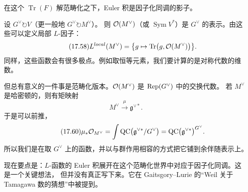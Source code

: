 在这个 $\operatorname{Tr}(F)$ 解范畴化之下，Euler 积是因子化同调的影子。

设 $G^{\vee}\circlearrowright V$（更一般地 $G^{\vee}\circlearrowright M^{\vee}$）。
则 $\mathcal{O}(M^{\vee})$（或 $\operatorname{Sym}V^*$）是 $G^{\vee}$ 的表示。由这些可以定义局部 $L$-因子：
\begin{equation}\tag{17.58}\label{eq:17.58}
L^{local}(M^{\vee})=\bigl\{g\mapsto\operatorname{Tr}\bigl(g,\mathcal{O}(M^{\vee})\bigr)\bigr\}.
\end{equation}
同样，这些函数会有很多极点。例如取恒等元素，我们要计算的是对称代数的维数。

但总有意义的一件事是范畴化版本。$\mathcal{O}(M^{\vee})$ 是 $\mathrm{Rep}(G^{\vee})$ 中的交换代数。
若 $M^{\vee}$ 是哈密顿的，则有矩映射
\begin{equation}\tag{17.59}\label{eq:17.59}
M^{\vee}\xrightarrow{\ \mu\ }\mathfrak g^{\vee*}.
\end{equation}
于是可以前推，
\begin{equation}\tag{17.60}\label{eq:17.60}
\mu_*\mathcal{O}_{M^{\vee}}=\int\mathrm{QC}\bigl(\mathfrak g^{\vee*}/G^{\vee}\bigr)
=\mathrm{QC}\bigl(\mathfrak g^{\vee*}\bigr)^{G^{\vee}}.
\end{equation}
所以我们是在取 $G^{\vee}$ 上的函数，并以与群作用相容的方式把它铺到余伴随表示上。


现在要点是：$L$-函数的 Euler 积展开在这个范畴化世界中对应于因子化同调。这是一个关键想法，
但并没有真正写下来。它在 Gaitsgory--Lurie 的“Weil 关于 Tamagawa 数的猜想”中被提到。

